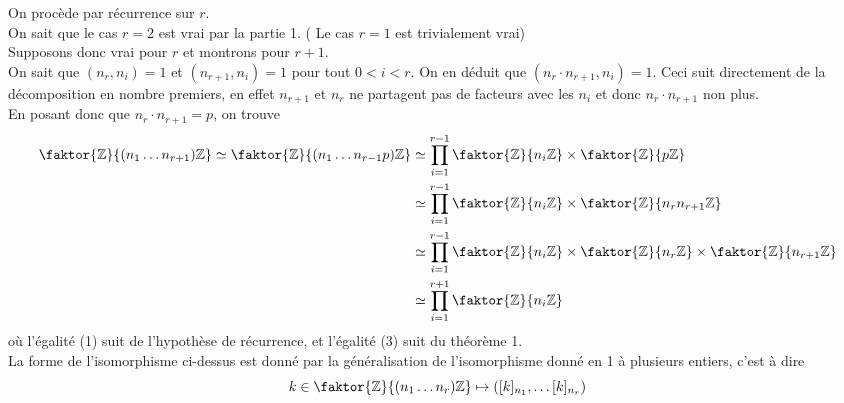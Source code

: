\documentclass[11pt, a4paper, twoside]{article}
\newcommand{\f}{\faktor}
\begin{document}
On procède par récurrence sur $r$.\\
On sait que le cas $r=2$ est vrai par la partie 1. ( Le cas $r=1$ est trivialement vrai)\\
Supposons donc vrai pour $r$ et montrons pour $r+1$.\\
On sait que $(n_r, n_i) =1$ et $( n_{r+1} , n_i) =1$ pour tout $0<i<r$. On en déduit que $( n_r \cdot n_{r+1} , n_i) =1$. Ceci suit directement de la décomposition en nombre premiers, en effet $n_{r+1} $ et $n_r$ ne partagent pas de facteurs avec les $n_i$ et donc $n_r \cdot n_{r+1} $ non plus.\\
En posant donc que $n_r\cdot n_{r+1}= p $, on trouve
\begin{align}
	\f { \mathbb{Z}} { ( n_1\ldots n_{r+1})\mathbb{Z}} \simeq \f { \mathbb{Z}} { ( n_1\ldots n_{r-1} p) \mathbb{Z}} &\simeq \prod_{i=1}^{r-1}\f { \mathbb{Z}} { n_i \mathbb{Z} }  \times \f { \mathbb{Z}} { p \mathbb{Z}} \\
							      &\simeq \prod_{i=1}^{r-1} \f { \mathbb{Z}} { n_i \mathbb{Z} }\times \f { \mathbb{Z}} { n_r n_{r+1} \mathbb{Z}} \\
							      &\simeq \prod_{i=1}^{r-1}\f { \mathbb{Z}} { n_i \mathbb{Z} }  \times \f { \mathbb{Z}} { n_r \mathbb{Z}} \times \f { \mathbb{Z}} { n_{r+1} \mathbb{Z}} \\
							      &\simeq \prod_{i=1}^{r+1}\f { \mathbb{Z}} { n_i \mathbb{Z}} 
\end{align}
où l'égalité (1) suit de l'hypothèse de récurrence, et l'égalité (3) suit du théorème 1.\\
La forme de l'isomorphisme ci-dessus est donné par la généralisation de l'isomorphisme donné en 1 à plusieurs entiers, c'est à dire
\[ 
	k \in \f { \mathbb{Z}} { ( n_1\ldots n_{r}) \mathbb{Z}} \mapsto ( [ k]_{n_1} , \ldots [k]_{n_r} ) 
\]
\end{document}
